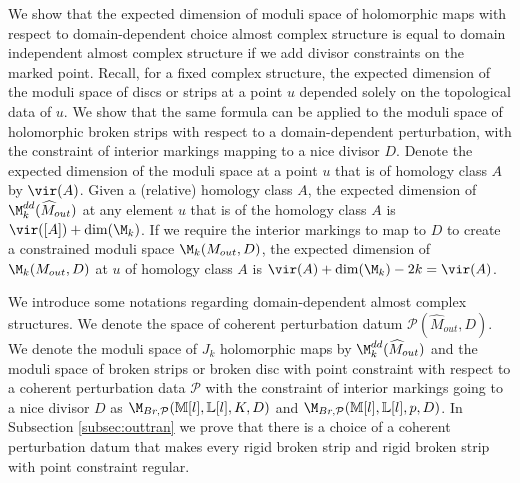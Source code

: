 We show that the expected dimension of moduli space of holomorphic maps with respect to domain-dependent choice almost complex structure is equal to domain independent almost complex structure if we add divisor constraints on the marked point.   Recall, for a fixed complex structure, the expected dimension of the moduli space of discs or strips at a point $u$ depended solely on the topological data of $u$. We show that the same formula can be applied to the moduli space of holomorphic broken strips with respect to a domain-dependent perturbation, with the constraint of interior markings mapping to a nice divisor $D$. Denote the expected dimension of the moduli space at a point $u$ that is of homology class $A$ by $\vir(A)$.  Given a (relative) homology class $A$, the expected dimension of $\M^{dd}_{k}(\widehat M_{out})$ at any element $u$ that is of the homology class $A$ is $\vir([A])+\dim(\M_k)$. If we require the interior markings to map to $D$ to create a constrained moduli space $\M_{k}(M_{out},D)$, the expected dimension of $\M_{k}(M_{out},D)$ at $u$ of homology class $A$ is $\vir(A)+\dim(\M_k) - 2k = \vir(A)$. 





We introduce some notations regarding domain-dependent almost complex structures. We denote the space of coherent perturbation datum $\mathcal{P}(\widehat M_{out},D)$.  We denote the moduli space of $J_k$ holomorphic maps by $\M^{dd}_k(\widehat M_{out})$ and the moduli space of broken strips or broken disc with point constraint with respect to a coherent perturbation data $\mathcal{P}$ with the constraint of interior markings going to a nice divisor $D$ as $\M_{Br,\mathcal{P}}(\mathbb{M}[l],\mathbb{L}[l],K,D)$ and $\M_{Br,\mathcal{P}}(\mathbb{M}[l],\mathbb{L}[l],p,D)$. In Subsection \ref{subsec:outtran} we prove that there is a choice of a coherent perturbation datum that makes every rigid broken strip and rigid broken strip with point constraint regular.




